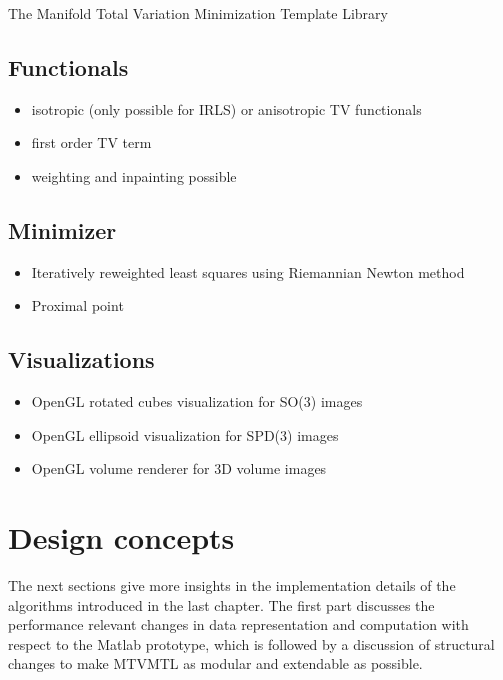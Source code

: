\begin{chapter}{The Manifold Total Variation Minimization Template Library}
\subsection*{Functionals} %
\label{sub:Functionals}
\begin{itemize}
    \item isotropic (only possible for IRLS) or anisotropic TV functionals
    \item first order TV term
    \item weighting and inpainting possible
\end{itemize}

\subsection*{Minimizer} %
\label{sub:Minimizer}
\begin{itemize}
	\item Iteratively reweighted least squares using Riemannian Newton method
	\item Proximal point
\end{itemize}

\subsection*{Visualizations} %
\label{sub:Visualizations}
\begin{itemize}
    \item OpenGL rotated cubes visualization for SO(3) images
    \item OpenGL ellipsoid visualization for SPD(3) images
    \item OpenGL volume renderer for 3D volume images
\end{itemize}


\section{Design concepts} %
\label{sec:Design}
The next sections give more insights in the implementation details of the algorithms introduced in the last chapter.
The first part discusses the performance relevant changes in data representation and computation
with respect to the Matlab prototype, which is followed by a discussion of structural changes to make
MTVMTL as modular and extendable as possible.\\


\end{chapter}
